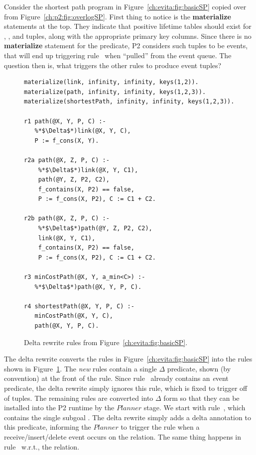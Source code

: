 Consider the shortest path program in Figure~\ref{ch:evita:fig:basicSP} copied
over from Figure~\ref{ch:p2:fig:overlogSP}.  First thing to notice is the {\bf
materialize} statements at the top.  They indicate that positive lifetime
tables should exist for , , and  tuples,
along with the appropriate primary key columns.  Since there is no {\bf
materialize} statement for the  predicate, P2 considers such
tuples to be events, that will end up triggering rule~ when ``pulled''
from the event queue.  The question then is, what triggers the other rules to
produce  event tuples?

\begin{figure}[!t]
\ssp
\centering
\begin{lstlisting}
materialize(link, infinity, infinity, keys(1,2)).
materialize(path, infinity, infinity, keys(1,2,3)).
materialize(shortestPath, infinity, infinity, keys(1,2,3)).

r1 path(@X, Y, P, C) :-
   %*$\Delta$*)link(@X, Y, C), 
   P := f_cons(X, Y).

r2a path(@X, Z, P, C) :-
    %*$\Delta$*)link(@X, Y, C1), 
    path(@Y, Z, P2, C2),
    f_contains(X, P2) == false,
    P := f_cons(X, P2), C := C1 + C2.

r2b path(@X, Z, P, C) :-
    %*$\Delta$*)path(@Y, Z, P2, C2), 
    link(@X, Y, C1),
    f_contains(X, P2) == false,
    P := f_cons(X, P2), C := C1 + C2.

r3 minCostPath(@X, Y, a_min<C>) :-
   %*$\Delta$*)path(@X, Y, P, C).

r4 shortestPath(@X, Y, P, C) :-
   minCostPath(@X, Y, C), 
   path(@X, Y, P, C).
\end{lstlisting}
\caption{\label{ch:evita:fig:basicSPDelta}Delta rewrite rules from Figure~\ref{ch:evita:fig:basicSP}.}
\end{figure}

The delta rewrite converts the rules in Figure~\ref{ch:evita:fig:basicSP} into
the rules shown in Figure~\ref{ch:evita:fig:basicSPDelta}.  The {\em new} rules
contain a single $\Delta$ predicate, shown (by convention) at the front of the
rule.  Since rule~ already contains an {\emph event} predicate, the
delta rewrite simply ignores this rule, which is fixed to trigger off of
 tuples.  The remaining rules are converted into $\Delta$ form
so that they can be installed into the P2 runtime by the $Planner$ stage.  We
start with rule~, which contains the single subgoal .  The
delta rewrite simply adds a delta annotation to this predicate, informing the
$Planner$ to trigger the rule when a receive/insert/delete event occurs on the
 relation.  The same thing happens in rule~ w.r.t., the
 relation.

